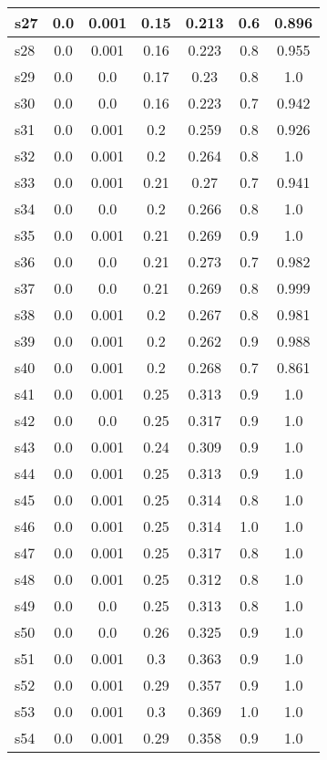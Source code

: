 \documentclass{article}
\begin{document}
\begin{tabular}{|l|c|c|c|c|c|c|}
\hline
s27 &0.0 & 0.001 & 0.15 & 0.213 & 0.6 & 0.896\\
\hline
s28 &0.0 & 0.001 & 0.16 & 0.223 & 0.8 & 0.955\\
\hline
s29 &0.0 & 0.0 & 0.17 & 0.23 & 0.8 & 1.0\\
\hline
s30 &0.0 & 0.0 & 0.16 & 0.223 & 0.7 & 0.942\\
\hline
s31 &0.0 & 0.001 & 0.2 & 0.259 & 0.8 & 0.926\\
\hline
s32 &0.0 & 0.001 & 0.2 & 0.264 & 0.8 & 1.0\\
\hline
s33 &0.0 & 0.001 & 0.21 & 0.27 & 0.7 & 0.941\\
\hline
s34 &0.0 & 0.0 & 0.2 & 0.266 & 0.8 & 1.0\\
\hline
s35 &0.0 & 0.001 & 0.21 & 0.269 & 0.9 & 1.0\\
\hline
s36 &0.0 & 0.0 & 0.21 & 0.273 & 0.7 & 0.982\\
\hline
s37 &0.0 & 0.0 & 0.21 & 0.269 & 0.8 & 0.999\\
\hline
s38 &0.0 & 0.001 & 0.2 & 0.267 & 0.8 & 0.981\\
\hline
s39 &0.0 & 0.001 & 0.2 & 0.262 & 0.9 & 0.988\\
\hline
s40 &0.0 & 0.001 & 0.2 & 0.268 & 0.7 & 0.861\\
\hline
s41 &0.0 & 0.001 & 0.25 & 0.313 & 0.9 & 1.0\\
\hline
s42 &0.0 & 0.0 & 0.25 & 0.317 & 0.9 & 1.0\\
\hline
s43 &0.0 & 0.001 & 0.24 & 0.309 & 0.9 & 1.0\\
\hline
s44 &0.0 & 0.001 & 0.25 & 0.313 & 0.9 & 1.0\\
\hline
s45 &0.0 & 0.001 & 0.25 & 0.314 & 0.8 & 1.0\\
\hline
s46 &0.0 & 0.001 & 0.25 & 0.314 & 1.0 & 1.0\\
\hline
s47 &0.0 & 0.001 & 0.25 & 0.317 & 0.8 & 1.0\\
\hline
s48 &0.0 & 0.001 & 0.25 & 0.312 & 0.8 & 1.0\\
\hline
s49 &0.0 & 0.0 & 0.25 & 0.313 & 0.8 & 1.0\\
\hline
s50 &0.0 & 0.0 & 0.26 & 0.325 & 0.9 & 1.0\\
\hline
s51 &0.0 & 0.001 & 0.3 & 0.363 & 0.9 & 1.0\\
\hline
s52 &0.0 & 0.001 & 0.29 & 0.357 & 0.9 & 1.0\\
\hline
s53 &0.0 & 0.001 & 0.3 & 0.369 & 1.0 & 1.0\\
\hline
s54 &0.0 & 0.001 & 0.29 & 0.358 & 0.9 & 1.0\\
\hline

\end{tabular}
\end{document}
